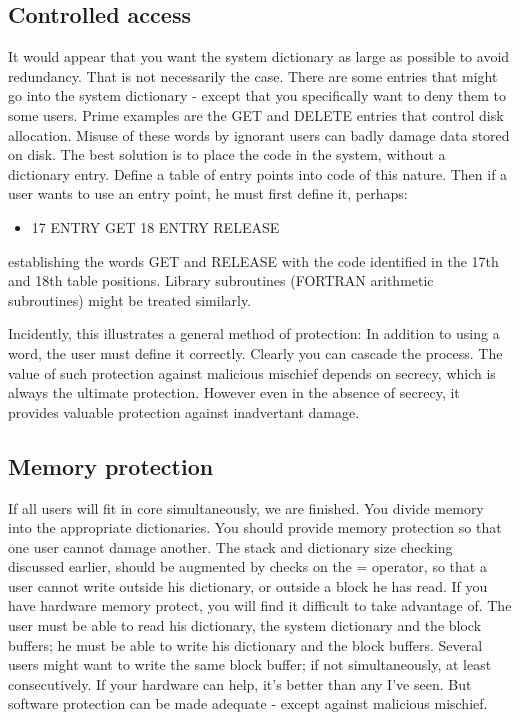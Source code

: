 \documentclass[b5paper, oneside]{book}
\begin{document}
\subsection{Controlled access}
It would appear that you want the system dictionary as large as possible to avoid redundancy. That is not necessarily the case. There are some entries that might go into the system dictionary - except that you specifically want to deny them to some users. Prime examples are the GET and DELETE entries that control disk allocation. Misuse of these words by ignorant users can badly damage data stored on disk. The best solution is to place the code in the system, without a dictionary entry. Define a table of entry points into code of this nature. Then if a user wants to use an entry point, he must first define it, perhaps:\begin{itemize}
   \item 17 ENTRY GET 18 ENTRY RELEASE\end{itemize}
establishing the words GET and RELEASE with the code identified in the 17th and 18th table positions. Library subroutines (FORTRAN arithmetic subroutines) might be treated similarly.

Incidently, this illustrates a general method of protection: In addition to using a word, the user must define it correctly. Clearly you can cascade the process. The value of such protection against malicious mischief depends on secrecy, which is always the ultimate protection. However even in the absence of secrecy, it provides valuable protection against inadvertant damage.

\subsection{Memory protection}
If all users will fit in core simultaneously, we are finished. You divide memory into the appropriate dictionaries. You should provide memory protection so that one user cannot damage another. The stack and dictionary size checking discussed earlier, should be augmented by checks on the = operator, so that a user cannot write outside his dictionary, or outside a block he has read. If you have hardware memory protect, you will find it difficult to take advantage of. The user must be able to read his dictionary, the system dictionary and the block buffers; he must be able to write his dictionary and the block buffers. Several users might want to write the same block buffer; if not simultaneously, at least consecutively. If your hardware can help, it's better than any I've seen. But software protection can be made adequate - except against malicious mischief.
\end{document}

